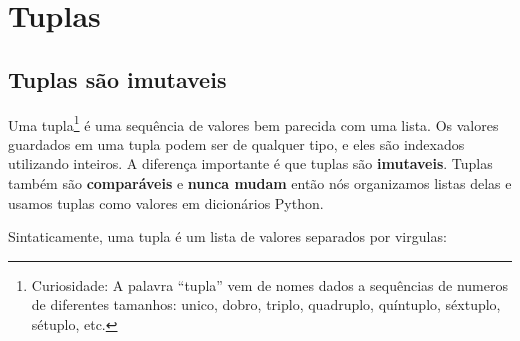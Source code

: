 
\chapter{Tuplas}
\label{tuplechap}

\section{Tuplas são imutaveis}


Uma tupla\footnote{Curiosidade: A palavra ``tupla'' vem de nomes 
dados a sequências de numeros de diferentes tamanhos: unico, dobro,
triplo, quadruplo, quíntuplo, séxtuplo, sétuplo, etc.} é uma sequência
de valores bem parecida com uma lista.
Os valores guardados em uma tupla podem ser de qualquer tipo, e
eles são indexados utilizando inteiros.
A diferença importante é que tuplas são {\bf imutaveis}.
Tuplas também são {\bf comparáveis} e {\bf nunca mudam} então nós
organizamos listas delas e usamos tuplas como valores em dicionários Python.


Sintaticamente, uma tupla é um lista de valores separados por virgulas:

